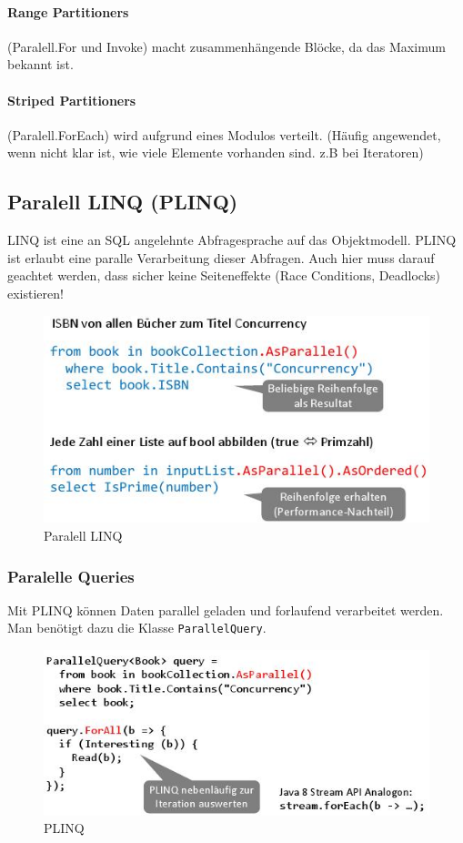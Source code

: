 \paragraph{Range Partitioners} (Paralell.For und Invoke) macht zusammenhängende Blöcke, da das Maximum bekannt ist. 

\paragraph{Striped Partitioners} (Paralell.ForEach) wird aufgrund eines Modulos verteilt. (Häufig angewendet, wenn nicht klar ist, wie viele Elemente vorhanden sind. z.B bei Iteratoren)


\subsection{Paralell LINQ (PLINQ)}
LINQ ist eine an SQL angelehnte Abfragesprache auf das Objektmodell. PLINQ ist erlaubt eine paralle Verarbeitung dieser Abfragen. Auch hier muss darauf geachtet werden, dass sicher keine Seiteneffekte (Race Conditions, Deadlocks) existieren!
\begin{figure}[h]
	\centering
	\includegraphics[width=0.6\linewidth]{img/csharp_linq_paralell}
	\caption{Paralell LINQ}
	\label{fig:csharplinqparalell}
\end{figure}


\subsubsection{Paralelle Queries}
Mit PLINQ können Daten parallel geladen und forlaufend verarbeitet werden. Man benötigt dazu die Klasse \lstinline|ParallelQuery|.
\begin{figure}[h]
	\centering
	\includegraphics[width=0.7\linewidth]{img/csharp_plinq}
	\caption{PLINQ}
	\label{fig:csharpplinq}
\end{figure}


